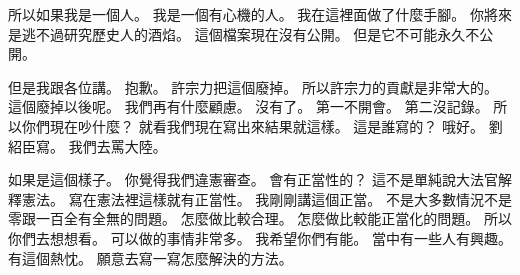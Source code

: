 \hypertarget{w01:cue:1766}{}所以如果我是一個人。
\hypertarget{w01:cue:1767}{}我是一個有心機的人。
\hypertarget{w01:cue:1768}{}我在這裡面做了什麼手腳。
\hypertarget{w01:cue:1769}{}你將來是逃不過研究歷史人的酒焰。
\hypertarget{w01:cue:1770}{}這個檔案現在沒有公開。
\hypertarget{w01:cue:1771}{}但是它不可能永久不公開。

\hypertarget{w01:cue:1772}{}但是我跟各位講。
\hypertarget{w01:cue:1773}{}抱歉。
\hypertarget{w01:cue:1774}{}許宗力把這個廢掉。
\hypertarget{w01:cue:1775}{}所以許宗力的貢獻是非常大的。
\hypertarget{w01:cue:1776}{}這個廢掉以後呢。
\hypertarget{w01:cue:1777}{}我們再有什麼顧慮。
\hypertarget{w01:cue:1778}{}沒有了。
\hypertarget{w01:cue:1779}{}第一不開會。
\hypertarget{w01:cue:1780}{}第二沒記錄。
\hypertarget{w01:cue:1781}{}所以你們現在吵什麼？
\hypertarget{w01:cue:1782}{}就看我們現在寫出來結果就這樣。
\hypertarget{w01:cue:1783}{}這是誰寫的？
\hypertarget{w01:cue:1784}{}哦好。
\hypertarget{w01:cue:1785}{}劉紹臣寫。
\hypertarget{w01:cue:1786}{}我們去罵大陸。

\hypertarget{w01:cue:1787}{}如果是這個樣子。
\hypertarget{w01:cue:1788}{}你覺得我們違憲審查。
\hypertarget{w01:cue:1789}{}會有正當性的？
\hypertarget{w01:cue:1790}{}這不是單純說大法官解釋憲法。
\hypertarget{w01:cue:1791}{}寫在憲法裡這樣就有正當性。
\hypertarget{w01:cue:1792}{}我剛剛講這個正當。
\hypertarget{w01:cue:1793}{}不是大多數情況不是零跟一百全有全無的問題。
\hypertarget{w01:cue:1794}{}怎麼做比較合理。
\hypertarget{w01:cue:1795}{}怎麼做比較能正當化的問題。
\hypertarget{w01:cue:1796}{}所以你們去想想看。
\hypertarget{w01:cue:1797}{}可以做的事情非常多。
\hypertarget{w01:cue:1798}{}我希望你們有能。
\hypertarget{w01:cue:1799}{}當中有一些人有興趣。
\hypertarget{w01:cue:1800}{}有這個熱忱。
\hypertarget{w01:cue:1801}{}願意去寫一寫怎麼解決的方法。

